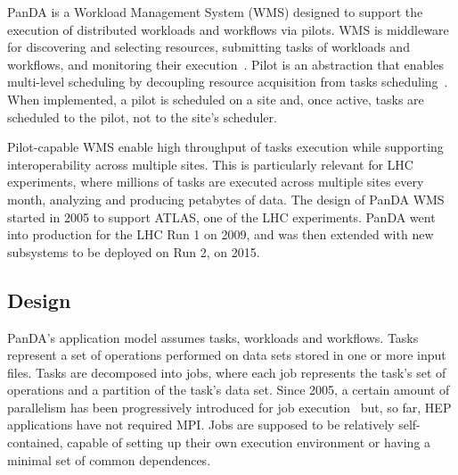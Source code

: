 PanDA is a Workload Management System (WMS) designed to support the execution of
distributed workloads and workflows via pilots. WMS is middleware for
discovering and selecting resources, submitting tasks of workloads and
workflows, and monitoring their execution~\cite{marco2009glite}. Pilot is an
abstraction that enables multi-level scheduling by decoupling resource
acquisition from tasks scheduling~\cite{turilli2015comprehensive}. When
implemented, a pilot is scheduled on a site and, once active, tasks are
scheduled to the pilot, not to the site's scheduler.

Pilot-capable WMS enable high throughput of tasks execution while supporting
interoperability across multiple sites. This is particularly relevant for LHC
experiments, where millions of tasks are executed across multiple sites every
month, analyzing and producing petabytes of data. The design of PanDA WMS
started in 2005 to support ATLAS, one of the LHC experiments. PanDA went into
production for the LHC Run 1 on 2009, and was then extended with new subsystems
to be deployed on Run 2, on 2015.



\subsection{Design}
\label{ssec:panda_design}


PanDA's application model assumes tasks, workloads and workflows. Tasks
represent a set of operations performed on
data sets stored in one or more input files. Tasks are decomposed into jobs,
where each job represents the task's set of operations and a partition of the
task's
data set. Since 2005, a certain amount of parallelism has been
progressively introduced for job execution~\cite{crooks2012multi} but, so far,
HEP applications have not required MPI. Jobs are supposed to be relatively self-contained, capable of setting
up their own execution environment or having a minimal set of common
dependences.

